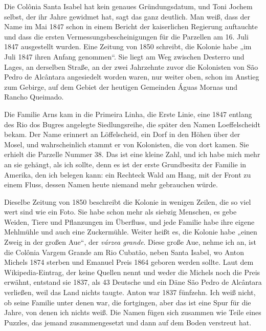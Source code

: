 \documentclass[
  ngerman,
  11pt,
  openany]{book}
\begin{document}
Die Colônia Santa Isabel hat kein genaues Gründungsdatum, und Toni
Jochem selbst, der ihr Jahre gewidmet hat, sagt das ganz deutlich. Man
weiß, dass der Name im Mai 1847 schon in einem Bericht der kaiserlichen
Regierung auftauchte und dass die ersten Vermessungsbescheinigungen für
die Parzellen am 16. Juli 1847 ausgestellt wurden. Eine Zeitung von 1850
schreibt, die Kolonie habe „im Juli 1847 ihren Anfang genommen``. Sie
liegt am Weg zwischen Desterro und Lages, an derselben Straße, an der
zwei Jahrzehnte zuvor die Kolonisten von São Pedro de Alcântara
angesiedelt worden waren, nur weiter oben, schon im Anstieg zum Gebirge,
auf dem Gebiet der heutigen Gemeinden Águas Mornas und Rancho Queimado.

Die Familie Arns kam in die Primeira Linha, die Erste Linie, eine 1847
entlang des Rio dos Bugres angelegte Siedlungsreihe, die später den
Namen Loeffelscheidt bekam. Der Name erinnert an Löffelscheid, ein Dorf
in den Höhen über der Mosel, und wahrscheinlich stammt er von
Kolonisten, die von dort kamen. Sie erhielt die Parzelle Nummer 38. Das
ist eine kleine Zahl, und ich habe mich mehr an sie gehängt, als ich
sollte, denn es ist der erste Grundbesitz der Familie in Amerika, den
ich belegen kann: ein Rechteck Wald am Hang, mit der Front zu einem
Fluss, dessen Namen heute niemand mehr gebrauchen würde.

Dieselbe Zeitung von 1850 beschreibt die Kolonie in wenigen Zeilen, die
so viel wert sind wie ein Foto. Sie habe schon mehr als siebzig
Menschen, es gebe Weiden, Tiere und Pflanzungen im Überfluss, und jede
Familie habe ihre eigene Mehlmühle und auch eine Zuckermühle. Weiter
heißt es, die Kolonie habe „einen Zweig in der großen Aue``, der
\emph{várzea grande}. Diese große Aue, nehme ich an, ist die Colônia
Vargem Grande am Rio Cubatão, neben Santa Isabel, wo Anton Michels 1874
sterben und Emanuel Preis 1864 geboren werden sollte. Laut dem
Wikipedia-Eintrag, der keine Quellen nennt und weder die Michels noch
die Preis erwähnt, entstand sie 1837, als 43 Deutsche und ein Däne São
Pedro de Alcântara verließen, weil das Land nichts taugte. Anton war
1837 fünfzehn. Ich weiß nicht, ob seine Familie unter denen war, die
fortgingen, aber das ist eine Spur für die Jahre, von denen ich nichts
weiß. Die Namen fügen sich zusammen wie Teile eines Puzzles, das jemand
zusammengesetzt und dann auf dem Boden verstreut hat.
\end{document}
